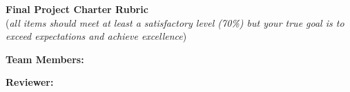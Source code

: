 \documentclass[landscape, 11pt]{article}
\newcommand{\blank}{\hrulefill}
\begin{document}
\thispagestyle{empty}


\begin{center}
    \textbf{Final Project Charter Rubric}\\
    (\emph{all items should meet at least a satisfactory level (70\%) but your true goal is to exceed expectations and achieve excellence})
\end{center}

\vspace{0.5em}

\footnotesize

\noindent \textbf{Team Members:} \blank{}

\noindent \textbf{Reviewer:} \blank{}\

\end{document}
